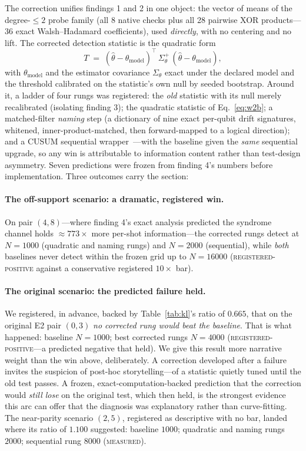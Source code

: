 \documentclass[11pt]{article}
\newcommand{\grade}[1]{\textsc{#1}}
\newcommand{\gMeasured}{\grade{measured}}
\newcommand{\gRegPos}{\grade{registered-positive}}
\theoremstyle{definition}
\begin{document}
The correction unifies findings 1 and 2 in one object: the vector of means of the degree-$\le 2$ probe family (all 8 native checks plus all 28 pairwise XOR products---36 exact Walsh--Hadamard coefficients), used \emph{directly}, with no centering and no lift. The corrected detection statistic is the quadratic form
\begin{equation}
T \;=\; (\hat\theta - \theta_{\mathrm{model}})^{\top}\, \Sigma_{\theta}^{+}\, (\hat\theta - \theta_{\mathrm{model}}),
\label{eq:w2b}
\end{equation}
with $\theta_{\mathrm{model}}$ and the estimator covariance $\Sigma_\theta$ exact under the declared model and the threshold calibrated on the statistic's own null by seeded bootstrap. Around it, a ladder of four rungs was registered: the \emph{old} statistic with its null merely recalibrated (isolating finding 3); the quadratic statistic of Eq.~\eqref{eq:w2b}; a matched-filter \emph{naming} step (a dictionary of nine exact per-qubit drift signatures, whitened, inner-product-matched, then forward-mapped to a logical direction); and a CUSUM sequential wrapper~\cite{page1954continuous}---with the baseline given the \emph{same} sequential upgrade, so any win is attributable to information content rather than test-design asymmetry. Seven predictions were frozen from finding 4's numbers before implementation. Three outcomes carry the section:

\paragraph{The off-support scenario: a dramatic, registered win.} On pair $(4,8)$---where finding 4's exact analysis predicted the syndrome channel holds $\approx 773\times$ more per-shot information---the corrected rungs detect at $N = 1000$ (quadratic and naming rungs) and $N = 2000$ (sequential), while \emph{both} baselines never detect within the frozen grid up to $N = 16000$ (\gRegPos{} against a conservative registered $10\times$ bar). 

\paragraph{The original scenario: the predicted failure held.} We registered, in advance, backed by Table~\ref{tab:kl}'s ratio of $0.665$, that on the original E2 pair $(0,3)$ \emph{no corrected rung would beat the baseline}. That is what happened: baseline $N = 1000$; best corrected rungs $N = 4000$ (\gRegPos---a predicted negative that held). We give this result more narrative weight than the win above, deliberately. A correction developed after a failure invites the suspicion of post-hoc storytelling---of a statistic quietly tuned until the old test passes. A frozen, exact-computation-backed prediction that the correction would \emph{still lose} on the original test, which then held, is the strongest evidence this arc can offer that the diagnosis was explanatory rather than curve-fitting. The near-parity scenario $(2,5)$, registered as descriptive with no bar, landed where its ratio of $1.100$ suggested: baseline $1000$; quadratic and naming rungs $2000$; sequential rung $8000$ (\gMeasured). 
\end{document}
